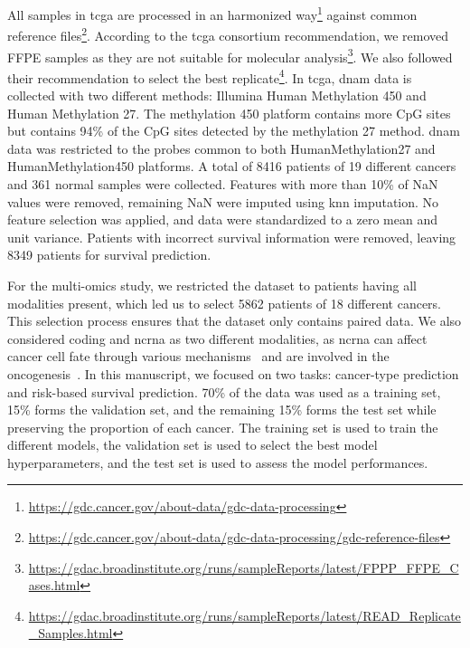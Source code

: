 \documentclass[../main.tex]{subfiles}
\begin{document}
		All samples in \gls{tcga} are processed in an harmonized way\footnote{\url{https://gdc.cancer.gov/about-data/gdc-data-processing}} against common reference files\footnote{\url{https://gdc.cancer.gov/about-data/gdc-data-processing/gdc-reference-files}}.
		According to the \gls{tcga} consortium recommendation, we removed FFPE samples as they are not suitable for molecular analysis\footnote{\href{https://web.archive.org/web/20150919082952/https://gdac.broadinstitute.org/runs/sampleReports/latest/FPPP_FFPE_Cases.html}{https://gdac.broadinstitute.org/runs/sampleReports/latest/FPPP\_FFPE\_Cases.html}}.
		We also followed their recommendation to select the best replicate\footnote{\href{https://web.archive.org/web/20150919044554/http://gdac.broadinstitute.org/runs/sampleReports/latest/READ_Replicate_Samples.html}{https://gdac.broadinstitute.org/runs/sampleReports/latest/READ\_Replicate\_Samples.html}}.
		In \gls{tcga}, \gls{dnam} data is collected with two different methods: Illumina Human Methylation 450 and Human Methylation 27.
		The methylation 450 platform contains more CpG sites but contains 94\% of the CpG sites detected by the methylation 27 method.
		\Gls{dnam} data was restricted to the probes common to both HumanMethylation27 and HumanMethylation450 platforms.
		A total of 8416 patients of 19 different cancers and 361 normal samples were collected.
		Features with more than 10\% of NaN values were removed, remaining NaN were imputed using \gls{knn} imputation.
		No feature selection was applied, and data were standardized to a zero mean and unit variance.
		Patients with incorrect survival information were removed, leaving 8349 patients for survival prediction.

		For the multi-omics study, we restricted the dataset to patients having all modalities present, which led us to select 5862 patients of 18 different cancers.
		This selection process ensures that the dataset only contains paired data.
		We also considered coding and \gls{ncrna} as two different modalities, as \gls{ncrna} can affect cancer cell fate through various mechanisms~\cite{Grillone2020} and are involved in the oncogenesis~\cite{Toden2021}.
		In this manuscript, we focused on two tasks: cancer-type prediction and risk-based survival prediction.
		70\% of the data was used as a training set, 15\% forms the validation set, and the remaining 15\% forms the test set while preserving the proportion of each cancer.
		The training set is used to train the different models, the validation set is used to select the best model hyperparameters, and the test set is used to assess the model performances.
\end{document}
